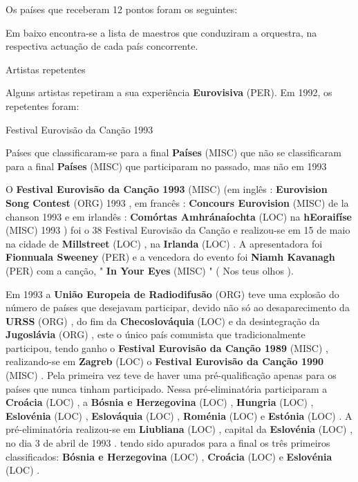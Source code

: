 \documentclass[12pt,a4paper]{article}
\begin{document}
Os países que receberam 12 pontos foram os seguintes:

Em baixo encontra-se a lista de maestros que conduziram a orquestra, na respectiva actuação de cada país concorrente.



Artistas repetentes

Alguns artistas repetiram a sua experiência \textbf{Eurovisiva} (PER). Em 1992, os repetentes foram:



Festival Eurovisão da Canção 1993



Países que classificaram-se para a final \textbf{Países} (MISC) que não se classificaram para a final \textbf{Países} (MISC) que participaram no passado, mas não em 1993

O \textbf{Festival Eurovisão da Canção 1993} (MISC) (em inglês : \textbf{Eurovision Song Contest} (ORG) 1993 , em francês : \textbf{Concours Eurovision} (MISC) de la chanson 1993 e em irlandês : \textbf{Comórtas Amhránaíochta} (LOC) na \textbf{hEoraifíse} (MISC) 1993 ) foi o 38 Festival Eurovisão da Canção e realizou-se em 15 de maio na cidade de \textbf{Millstreet} (LOC) , na \textbf{Irlanda} (LOC) . A apresentadora foi \textbf{Fionnuala Sweeney} (PER) e a vencedora do evento foi \textbf{Niamh Kavanagh} (PER) com a canção, " \textbf{In Your Eyes} (MISC) " ( Nos teus olhos ).

Em 1993 a \textbf{União Europeia de Radiodifusão} (ORG) teve uma explosão do número de países que desejavam participar, devido não só ao desaparecimento da \textbf{URSS} (ORG) , do fim da \textbf{Checoslováquia} (LOC) e da desintegração da \textbf{Jugoslávia} (ORG) , este o único país comunista que tradicionalmente participou, tendo ganho o \textbf{Festival Eurovisão da Canção 1989} (MISC) , realizando-se em \textbf{Zagreb} (LOC) o \textbf{Festival Eurovisão da Canção 1990} (MISC) . Pela primeira vez teve de haver uma pré-qualificação apenas para os países que nunca tinham participado. Nessa pré-eliminatória participaram a \textbf{Croácia} (LOC) , a \textbf{Bósnia e Herzegovina} (LOC) , \textbf{Hungria} (LOC) , \textbf{Eslovénia} (LOC) , \textbf{Eslováquia} (LOC) , \textbf{Roménia} (LOC) e \textbf{Estónia} (LOC) . A pré-eliminatória realizou-se em \textbf{Liubliana} (LOC) , capital da \textbf{Eslovénia} (LOC) , no dia 3 de abril de 1993 . tendo sido apurados para a final os três primeiros classificados: \textbf{Bósnia e Herzegovina} (LOC) , \textbf{Croácia} (LOC) e \textbf{Eslovénia} (LOC) .
\end{document}
